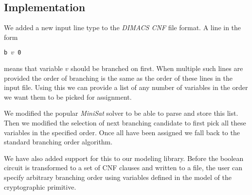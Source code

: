 \subsection{Implementation}
\label{sec:branching-order-impl}
We added a new input line type to the \emph{DIMACS CNF} file format.
A line in the form

\centerline{\texttt{b $v$ 0}}

\noindent means that variable $v$ should be branched on first.
When multiple such lines are provided the order of branching is the same as the order of these lines in the input file.
Using this we can provide a list of any number of variables in the order we want them to be picked for assignment.

We modified the popular \emph{MiniSat} solver \cite{een2005minisat} to be able to parse and store this list.
Then we modified the selection of next branching candidate to first pick all these variables in the specified order.
Once all have been assigned we fall back to the standard branching order algorithm.

We have also added support for this to our modeling library.
Before the boolean circuit is transformed to a set of CNF clauses and written to a file, the user can specify arbitrary branching order using variables defined in the model of the cryptographic primitive.
